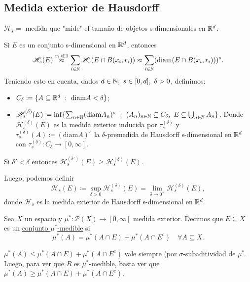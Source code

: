 \subsection*{Medida exterior de Hausdorff}

$\mathscr{H}_s =$ medida que "mide" el tamaño de objetos s-dimensionales en $\mathbb{R}^d$. \newline

Si $E$ es un conjunto s-dimensional en $\mathbb{R}^d$, entonces
\[
	\mathscr{H}_s (E) \stackrel{r_1 \ll 1}{\approx} \sum_{i\in\mathbb{N}} \mathscr{H}_s(E \cap B(x_i,r_i)) \approx \sum_{i\in\mathbb{N}} (\text{diam}(E \cap B(x_i,r_i)))^s
.\] 
Teniendo esto en cuenta, dados $d \in \mathbb{N},\ s \in [0,d],\ \delta > 0$, definimos:
\begin{itemize}
	\item $C_{\delta} \coloneq \{ A \subseteq \mathbb{R}^d \ : \ \text{diam}A < \delta \}$;

	\item $\mathscr{H}_{s}^{(\delta)} (E) \coloneq \inf \{ \sum_{n\in\mathbb{N}} (\text{diam}A_n)^s \ : \ (A_n)_{n\in\mathbb{N}} \subseteq C_{\delta},\ E \subseteq \bigcup_{n\in\mathbb{N}} A_n \}$. Donde $\mathscr{H}_{s}^{(\delta)} (E)$ es la medida exterior inducida por $\tau_{s}^{(\delta)}$ y $\tau_{s}^{(\delta)}(A) \coloneq (\text{diam}A)^s$ la $\delta$-premedida de Hausdorff s-dimensional en $\mathbb{R}^d$ con $\tau_{s}^{(\delta)} : C_{\delta} \to [0,\infty]$.
\end{itemize}

\begin{observe}
	Si $\delta' < \delta$ entonces $\mathscr{H}_{s}^{(\delta')}(E) \geq \mathscr{H}_{s}^{(\delta)} (E)$.
\end{observe}

\noindent Luego, podemos definir
\[
	\mathscr{H}_s(E) \coloneq \sup_{\delta>0} \mathscr{H}_{s}^{(\delta)}(E) = \lim_{\delta \to 0^{+}} \mathscr{H}_{s}^{(\delta)} (E) 
,\] 
donde $\mathscr{H}_s$ es la medida exterior de Hausdorff s-dimensional en $\mathbb{R}^d$.

\begin{definition}
	Sea $X$ un espacio y $\mu^{*} : \mathcal{P}(X) \to [0,\infty]$ medida exterior. Decimos que $E \subseteq X$ es un \underline{conjunto $\mu^{*}$-medible} si
	\[
		\mu^{*}(A) = \mu^{*}(A \cap E) + \mu^{*}(A \cap E^c) \quad \forall A \subseteq X
	.\] 
\end{definition}

\begin{observe}
	$\mu^{*}(A) \leq \mu^{*}(A \cap E) + \mu^{*}(A \cap E^c)$ vale siempre (por $\sigma$-subaditividad de $\mu^{*}$. Luego, para ver que $R$ es $\mu^{*}$-medible, basta ver que $\mu^{*}(A) \geq \mu^{*}(A \cap E) + \mu^{*}(A \cap E^c)$.
\end{observe}

